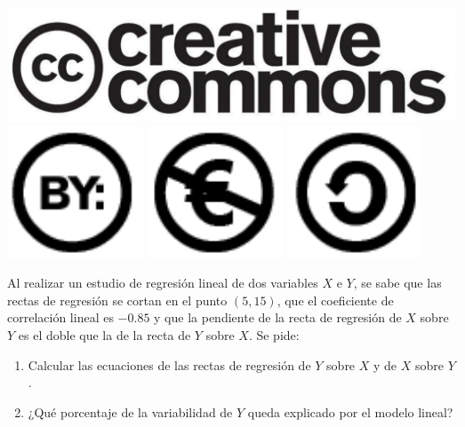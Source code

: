 \documentclass[aspectratio=149,10pt,xcolor=dvipsnames,t]{beamer}
\begin{document}
\begin{frame}[c]
\begin{center}
\biskip
\includegraphics[scale=0.07]{img/cc-logo}
\includegraphics[scale=0.2]{img/cc-by}
\includegraphics[scale=0.2]{img/cc-e}
\includegraphics[scale=0.2]{img/cc-c}\end{center}
\end{frame}

\begin{frame}[c]
Al realizar un estudio de regresión lineal de dos variables $X$ e $Y$, se sabe que las rectas de
regresión se cortan en el punto $(5,15)$, que el coeficiente de correlación lineal es $-0.85$ y que la pendiente de la
recta de regresión de $X$ sobre $Y$ es el doble que la de la recta de $Y$ sobre $X$. Se pide:
\begin{enumerate}
\item Calcular las ecuaciones de las rectas de regresión de $Y$ sobre $X$ y de $X$ sobre $Y$.
\item ¿Qué porcentaje de la variabilidad de $Y$ queda explicado por el modelo lineal?
\end{enumerate}
\end{frame}
\end{document}
